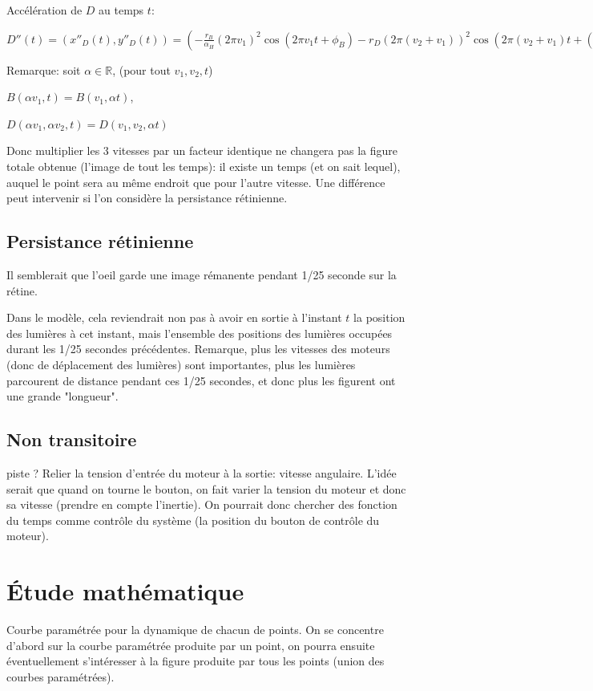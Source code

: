 \documentclass[11pt,a4paper]{article}
\newcommand{\R}{\mathbb R}%
\begin{document}
Accélération de $D$ au temps $t$:

$ D''(t) = (x''_D(t),y''_D(t)) = (-\frac{r_B}{\alpha_H} (2 \pi v_1)^2 \cos(2 \pi v_1 t + \phi_B) - r_D  (2 \pi (v_2 + v _1))^2 \cos(2 \pi (v_2 + v _1)t + (\phi_D + \phi_B)), - \frac{r_B}{\alpha_H} (2 \pi  v_1)^2 \sin(2 \pi v_1 t + \phi_B ) - r_D  (2 \pi (v_2 + v _1))^2 \sin(2 \pi (v_2 +v_1)t +  (\phi_D + \phi_B))  )$



Remarque: soit $\alpha \in \R$, (pour tout $v_1,v_2,t$)

$B(\alpha v_1,t) = B(v_1,\alpha t)$,

$D(\alpha v_1,\alpha v_2,t) = D(v_1,v_2,\alpha t)$

Donc multiplier les 3 vitesses par un facteur identique ne changera pas la figure totale obtenue (l'image de tout les temps): il existe un temps (et on sait lequel), auquel le point sera au même endroit que pour l'autre vitesse. Une différence peut intervenir si l'on considère la persistance rétinienne.




\subsection{Persistance rétinienne}

Il semblerait que l’oeil garde une image rémanente pendant 1/25 seconde sur la rétine.

Dans le modèle, cela reviendrait non pas à avoir en sortie à l'instant $t$ la position des lumières à cet instant, mais l'ensemble des positions des lumières occupées durant les 1/25 secondes précédentes. Remarque, plus les vitesses des moteurs (donc de déplacement des lumières) sont importantes, plus les lumières parcourent de distance pendant ces 1/25 secondes, et donc plus les figurent ont une grande "longueur".


\subsection{Non transitoire}

piste ? Relier la tension d'entrée du moteur à la sortie: vitesse angulaire. L'idée serait que quand on tourne le bouton, on fait varier la tension du moteur et donc sa vitesse (prendre en compte l'inertie). On pourrait donc chercher des fonction du temps comme contrôle du système (la position du bouton de contrôle du moteur).


\section{Étude mathématique}
Courbe paramétrée pour la dynamique de chacun de points. On se concentre d'abord sur la courbe paramétrée produite par un point, on pourra ensuite éventuellement s'intéresser à la figure produite par tous les points (union des courbes paramétrées).
\end{document}
